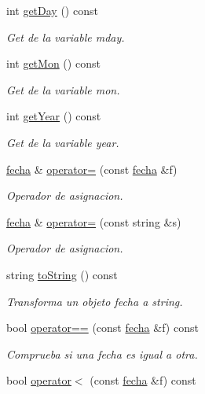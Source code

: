 \begin{DoxyCompactItemize}
int \hyperlink{classfecha_adac4ad0232177c0dd7d9cdaa2bd6d23c}{get\-Day} () const 
\begin{DoxyCompactList}\small\item\em Get de la variable mday. \end{DoxyCompactList}\item 
int \hyperlink{classfecha_a357b8e8cc03e1c5ea28994e8b818a371}{get\-Mon} () const 
\begin{DoxyCompactList}\small\item\em Get de la variable mon. \end{DoxyCompactList}\item 
int \hyperlink{classfecha_a45111b8fa9899eff07ff48e5b35ada09}{get\-Year} () const 
\begin{DoxyCompactList}\small\item\em Get de la variable year. \end{DoxyCompactList}\item 
\hyperlink{classfecha}{fecha} \& \hyperlink{classfecha_aeb5a68104e936f98eb933b4d6856f841}{operator=} (const \hyperlink{classfecha}{fecha} \&f)
\begin{DoxyCompactList}\small\item\em Operador de asignacion. \end{DoxyCompactList}\item 
\hyperlink{classfecha}{fecha} \& \hyperlink{classfecha_afff8905488f3d97ecfe6141f8521ac22}{operator=} (const string \&s)
\begin{DoxyCompactList}\small\item\em Operador de asignacion. \end{DoxyCompactList}\item 
string \hyperlink{classfecha_a26d22b980284408eac0da084f358c43b}{to\-String} () const 
\begin{DoxyCompactList}\small\item\em Transforma un objeto fecha a string. \end{DoxyCompactList}\item 
bool \hyperlink{classfecha_ac971e131a6e3edf57c2313468524f364}{operator==} (const \hyperlink{classfecha}{fecha} \&f) const 
\begin{DoxyCompactList}\small\item\em Comprueba si una fecha es igual a otra. \end{DoxyCompactList}\item 
bool \hyperlink{classfecha_a27803300b9698e1a40ef48f2009948c5}{operator$<$} (const \hyperlink{classfecha}{fecha} \&f) const 

\end{DoxyCompactItemize}
